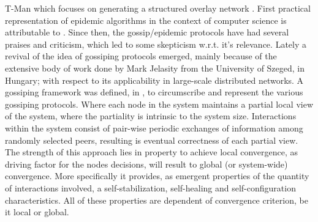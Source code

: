 \documentclass[11pt]{amsart}
\begin{document}
        T-Man which focuses on generating a structured overlay network
        \cite{jelasity2009t}. First practical representation of epidemic algorithms in the
        context of computer science is attributable to \cite{demers1987epidemic}. Since
        then, the gossip/epidemic protocols have had several praises and criticism, which
        led to some skepticism w.r.t. it's relevance. Lately a revival of the idea of
        gossiping protocols emerged, mainly because of the extensive body of work done by
        Mark Jelasity from the University of Szeged, in Hungary; with respect to its
        applicability in large-scale distributed networks. A gossiping framework was
        defined, in \cite{riviere2011gossip}, to circumscribe and represent the various
        gossiping protocols. Where each node in the system maintains a partial local view
        of the system, where the partiality is intrinsic to the system size. Interactions
        within the system consist of pair-wise periodic exchanges of information among
        randomly selected peers, resulting is eventual correctness of each partial
        view. The strength of this approach lies in property to achieve local
        convergence, as driving factor for the nodes decisions, will result to global (or
        system-wide) convergence. More specifically it provides, as emergent properties of
        the quantity of interactions involved, a self-stabilization, self-healing and
        self-configuration characteristics. All of these properties are dependent of
        convergence criterion, be it local or global.
\end{document}
